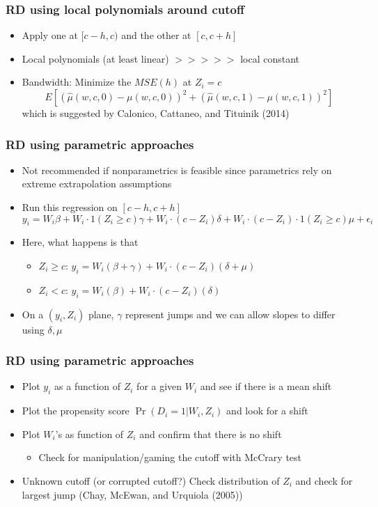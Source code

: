 \documentclass[aspectratio=169]{beamer}
\begin{document}
\begin{frame}
\frametitle{RD using local polynomials around cutoff}
\begin{itemize}
\item Apply one at  $[c-h, c)$ and the other at $[c, c+h]$
\item Local polynomials (at least linear) $>>>>>$ local constant
\item Bandwidth: Minimize the $MSE(h)$ at $Z_i=c$
\[
E[(\hat{\mu}(w,c,0)-\mu(w,c,0))^2+(\hat{\mu}(w,c,1)-\mu(w,c,1))^2]
\]
which is suggested by Calonico, Cattaneo, and Tituinik (2014) 
\end{itemize}
\end{frame}

\begin{frame}
\frametitle{RD using parametric approaches}
\begin{itemize}
\item Not recommended if nonparametrics is feasible since parametrics rely on extreme extrapolation assumptions
\item Run this regression on $[c-h,c+h]$
\[
y_i = W_i\beta+ W_i \cdot 1(Z_i\geq c)\gamma+W_i\cdot(c-Z_i)\delta+W_i\cdot (c-Z_i)\cdot 1(Z_i\geq c) \mu +\epsilon_i
\]
\item Here, what happens is that
\begin{itemize}
\item $Z_i\geq c$: $y_i=W_i(\beta+\gamma)+W_i\cdot(c-Z_i)(\delta+\mu)$
\item $Z_i< c$: $y_i=W_i(\beta)+W_i\cdot(c-Z_i)(\delta)$
\end{itemize}
\item On a $(y_i, Z_i)$ plane,  $\gamma$ represent jumps and we can allow slopes to differ using $\delta, \mu$
\end{itemize}
\end{frame}

\begin{frame}
\frametitle{RD using parametric approaches}
\begin{itemize}
\item Plot $y_i$ as a function of $Z_i$ for a given $W_i$ and see if there is a mean shift
\item Plot the propensity score $\Pr(D_i=1|W_i, Z_i)$ and look for a shift
\item Plot $W_i$'s as function of $Z_i$ and confirm that there is no shift
\begin{itemize}
\item Check for manipulation/gaming the cutoff with McCrary test
\end{itemize}
\item Unknown cutoff (or corrupted cutoff?) Check distribution of $Z_i$ and check for largest jump (Chay, McEwan, and Urquiola (2005))
\end{itemize}
\end{frame}
\end{document}
